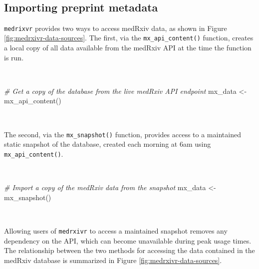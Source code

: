 \documentclass[a4paper, twoside]{templates/ociamthesis}
\newenvironment{Shaded}{\begin{snugshade}}{\end{snugshade}}
\newcommand{\CommentTok}[1]{\textcolor[rgb]{0.56,0.35,0.01}{\textit{#1}}}
\newcommand{\FunctionTok}[1]{\textcolor[rgb]{0.00,0.00,0.00}{#1}}
\newcommand{\NormalTok}[1]{#1}
\newcommand{\OtherTok}[1]{\textcolor[rgb]{0.56,0.35,0.01}{#1}}
\renewenvironment{Shaded}
{
  \vspace{4pt}%
  \begin{snugshade}%
}{%
  \end{snugshade}%
  \vspace{4pt}%
}
\begin{document}
~

\hypertarget{importing-preprint-metadata}{%
\subsection{Importing preprint metadata}\label{importing-preprint-metadata}}

\texttt{medrixvr} provides two ways to access medRxiv data, as shown in Figure \ref{fig:medrxivr-data-sources}. The first, via the \texttt{mx\_api\_content()} function, creates a local copy of all data available from the medRxiv API at the time the function is run.

~

\begin{Shaded}
\begin{Highlighting}[]
\CommentTok{\# Get a copy of the database from the live medRxiv API endpoint}
\NormalTok{mx\_data }\OtherTok{\textless{}{-}} \FunctionTok{mx\_api\_content}\NormalTok{()  }
\end{Highlighting}
\end{Shaded}

~

The second, via the \texttt{mx\_snapshot()} function, provides access to a maintained static snapshot of the database, created each morning at 6am using \texttt{mx\_api\_content()}.

~

\begin{Shaded}
\begin{Highlighting}[]
\CommentTok{\# Import a copy of the medRxiv data from the snapshot}
\NormalTok{mx\_data }\OtherTok{\textless{}{-}} \FunctionTok{mx\_snapshot}\NormalTok{()}
\end{Highlighting}
\end{Shaded}

~

Allowing users of \texttt{medrxivr} to access a maintained snapshot removes any dependency on the API, which can become unavailable during peak usage times. The relationship between the two methods for accessing the data contained in the medRxiv database is summarized in Figure \ref{fig:medrxivr-data-sources}.

~
\end{document}
